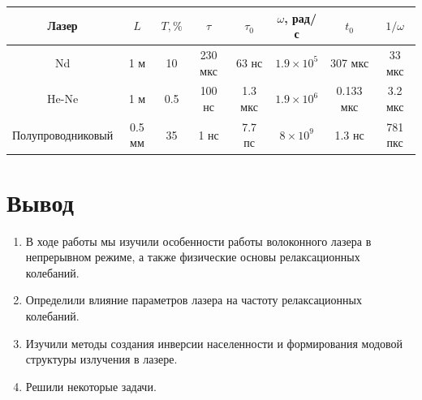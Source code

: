 \documentclass[a4paper, 12pt]{article}
\begin{document}
\begin{enumerate}
\begin{table}[h]
				\centering
				\begin{tabular}{|c|c|c|c|c|c|c|c|}
					\hline
					Лазер & $L$ & $T,\%$ & $\tau$ & $\tau_0$ & $\omega$, рад/с & $t_0$ & $1/\omega$\\
					\hline
					Nd & 1 м & 10 & 230 мкс & 63 нс & $1.9\times 10^5$ & 307 мкс & 33 мкс\\
					He-Ne & 1 м & 0.5 & 100 нс & 1.3 мкс & $1.9\times 10^{6}$ & 0.133 мкс & 3.2 мкс\\
					Полупроводниковый & 0.5 мм & 35 & 1 нс & 7.7 пс & $8\times 10^9$ & 1.3 нс & 781 пкс\\
					\hline
				\end{tabular}
			\end{table}
	\end{enumerate}
	\section{Вывод}
	\begin{enumerate}
		\item В ходе работы мы изучили особенности работы волоконного лазера в непрерывном режиме, а также физические основы релаксационных колебаний.
		\item Определили влияние параметров лазера на частоту релаксационных колебаний.
		\item Изучили методы создания инверсии населенности и формирования модовой структуры излучения в лазере.
		\item Решили некоторые задачи.
	\end{enumerate}
\end{document}
